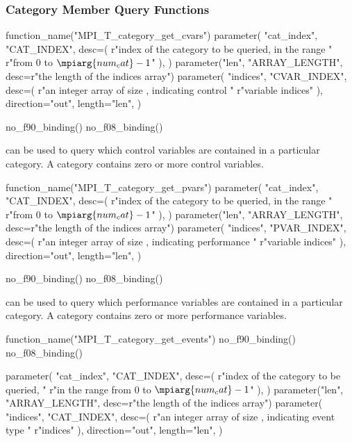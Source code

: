 \subsubsection{Category Member Query Functions}
\label{sec:mpit:category_query_functions}

\begin{mpi-binding}
    function_name("MPI_T_category_get_cvars")
    parameter(
        "cat_index",
        "CAT_INDEX",
        desc=(
            r"index of the category to be queried, in the range "
            r"from $0$ to $\mpiarg{num_cat}-1$"
        ),
    )
    parameter("len", "ARRAY_LENGTH", desc=r"the length of the indices array")
    parameter(
        "indices",
        "CVAR_INDEX",
        desc=(
            r"an integer array of size , indicating control "
            r"variable indices"
        ),
        direction="out",
        length="len",
    )
    
    no_f90_binding()
    no_f08_binding()
\end{mpi-binding}

 can be used to query which control variables are contained in a particular category.
A category contains zero or more control variables.


\begin{mpi-binding}
    function_name("MPI_T_category_get_pvars")
    parameter(
        "cat_index",
        "CAT_INDEX",
        desc=(
            r"index of the category to be queried, in the range "
            r"from $0$ to $\mpiarg{num_cat}-1$"
        ),
    )
    parameter("len", "ARRAY_LENGTH", desc=r"the length of the indices array")
    parameter(
        "indices",
        "PVAR_INDEX",
        desc=(
            r"an integer array of size , indicating performance "
            r"variable indices"
        ),
        direction="out",
        length="len",
    )
    
    no_f90_binding()
    no_f08_binding()
\end{mpi-binding}

 can be used to query which
performance variables are contained in a particular category.  A category
contains zero or more performance variables.

\begin{mpi-binding}
    function_name("MPI_T_category_get_events")
    no_f90_binding()
    no_f08_binding()

    parameter(
        "cat_index",
        "CAT_INDEX",
        desc=(
            r"index of the category to be queried, "
            r"in the range from $0$ to $\mpiarg{num_cat}-1$"
        ),
    )
    parameter("len", "ARRAY_LENGTH", desc=r"the length of the indices array")
    parameter(
        "indices",
        "CAT_INDEX",
        desc=(
            r"an integer array of size , indicating event type "
            r"indices"
        ),
        direction="out",
        length="len",
    )
\end{mpi-binding}

